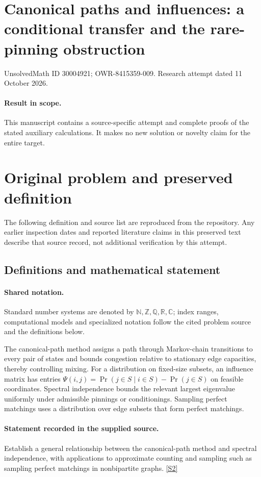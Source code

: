 \documentclass[11pt]{article}
\begin{document}
\section*{Canonical paths and influences: a conditional transfer and the rare-pinning obstruction}
\noindent UnsolvedMath ID 30004921; OWR-8415359-009. Research attempt dated 11 October 2026.
\paragraph{Result in scope.}This manuscript contains a source-specific attempt and complete proofs of the stated auxiliary calculations. It makes no new solution or novelty claim for the entire target.
\section{Original problem and preserved definition}
The following definition and source list are reproduced from the repository. Any earlier inspection dates and reported literature claims in this preserved text describe that source record, not additional verification by this attempt.
\subsection{Definitions and mathematical statement}

\paragraph{Shared notation.}Standard number systems are denoted by $\mathbb N,\mathbb Z,\mathbb Q,\mathbb R,\mathbb C$; index ranges, computational models and specialized notation follow the cited problem source and the definitions below.


The canonical-path method assigns a path through Markov-chain transitions to every pair of states and bounds congestion relative to stationary edge capacities, thereby controlling mixing. For a distribution on fixed-size subsets, an influence matrix has entries $\Psi(i,j)=\Pr(j\in S\mid i\in S)-\Pr(j\in S)$ on feasible coordinates. Spectral independence bounds the relevant largest eigenvalue uniformly under admissible pinnings or conditionings. Sampling perfect matchings uses a distribution over edge subsets that form perfect matchings.
\paragraph{Statement recorded in the supplied source.}
Establish a general relationship between the canonical-path method and spectral independence, with applications to approximate counting and sampling such as sampling perfect matchings in nonbipartite graphs. \href{https://doi.org/10.4171/owr/2021/54}{[S2]}
\end{document}
